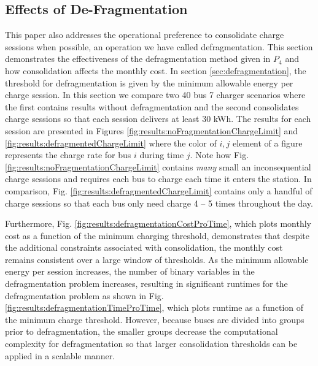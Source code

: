 \subsection{Effects of De-Fragmentation}
This paper also addresses the operational preference to consolidate charge sessions when possible, an operation we have called defragmentation. This section demonstrates the effectiveness of the defragmentation method given in $P_4$ and how consolidation affects the monthly cost. In section \ref{sec:defragmentation}, the threshold for defragmentation is given by the minimum allowable energy per charge session. In this section we compare two 40 bus 7 charger scenarios where the first contains results without defragmentation and the second consolidates charge sessions so that each session delivers at least 30 kWh. The results for each session are presented in Figures \ref{fig:results:noFragmentationChargeLimit} and \ref{fig:results:defragmentedChargeLimit} where the color of $i,j$ element of a figure represents the charge rate for bus $i$ during time $j$. Note how Fig. \ref{fig:results:noFragmentationChargeLimit} contains {\it many} small an inconsequential charge sessions and requires each bus to charge each time it enters the station. In comparison, Fig. \ref{fig:results:defragmentedChargeLimit} contains only a handful of charge sessions so that each bus only need charge 4 -- 5 times throughout the day.  
\par Furthermore, Fig. \ref{fig:results:defragmentationCostProTime}, which plots monthly cost as a function of the minimum charging threshold, demonstrates that despite the additional constraints associated with consolidation, the monthly cost remains consistent over a large window of thresholds. As the minimum allowable energy per session increases, the number of binary variables in the defragmentation problem increases, resulting in significant runtimes for the defragmentation problem as shown in Fig. \ref{fig:results:defragmentationTimeProTime}, which plots runtime as a function of the minimum charge threshold. However, because buses are divided into groups prior to defragmentation, the smaller groups decrease the computational complexity for defragmentation so that larger consolidation thresholds can be applied in a scalable manner. 
 



